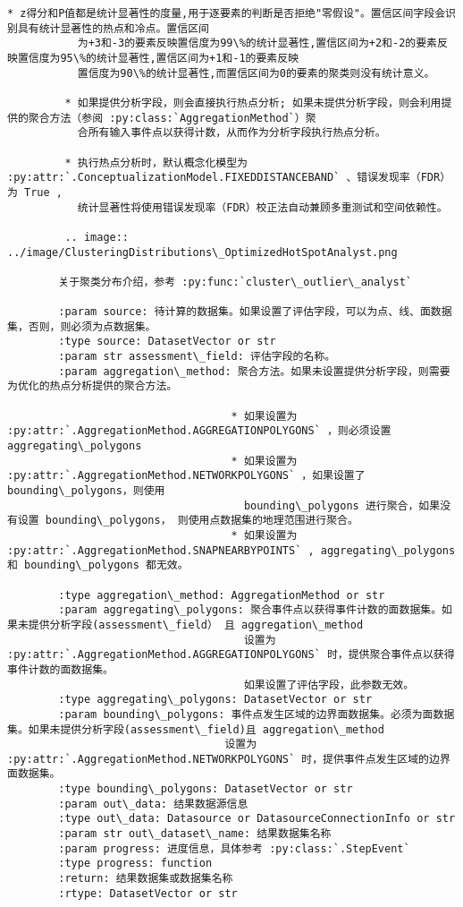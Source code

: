 \documentclass[11pt]{article}
\begin{document}
\begin{Verbatim}[commandchars=\\\{\}]
         * z得分和P值都是统计显著性的度量,用于逐要素的判断是否拒绝"零假设"。置信区间字段会识别具有统计显著性的热点和冷点。置信区间
           为+3和-3的要素反映置信度为99\%的统计显著性,置信区间为+2和-2的要素反映置信度为95\%的统计显著性,置信区间为+1和-1的要素反映
           置信度为90\%的统计显著性,而置信区间为0的要素的聚类则没有统计意义。
        
         * 如果提供分析字段，则会直接执行热点分析; 如果未提供分析字段，则会利用提供的聚合方法（参阅 :py:class:`AggregationMethod`）聚
           合所有输入事件点以获得计数，从而作为分析字段执行热点分析。
        
         * 执行热点分析时，默认概念化模型为 :py:attr:`.ConceptualizationModel.FIXEDDISTANCEBAND` 、错误发现率（FDR）为 True ,
           统计显著性将使用错误发现率（FDR）校正法自动兼顾多重测试和空间依赖性。
        
         .. image:: ../image/ClusteringDistributions\_OptimizedHotSpotAnalyst.png
        
        关于聚类分布介绍，参考 :py:func:`cluster\_outlier\_analyst`
        
        :param source: 待计算的数据集。如果设置了评估字段，可以为点、线、面数据集，否则，则必须为点数据集。
        :type source: DatasetVector or str
        :param str assessment\_field: 评估字段的名称。
        :param aggregation\_method: 聚合方法。如果未设置提供分析字段，则需要为优化的热点分析提供的聚合方法。
        
                                   * 如果设置为 :py:attr:`.AggregationMethod.AGGREGATIONPOLYGONS` ，则必须设置 aggregating\_polygons
                                   * 如果设置为 :py:attr:`.AggregationMethod.NETWORKPOLYGONS` ，如果设置了 bounding\_polygons，则使用
                                     bounding\_polygons 进行聚合，如果没有设置 bounding\_polygons， 则使用点数据集的地理范围进行聚合。
                                   * 如果设置为 :py:attr:`.AggregationMethod.SNAPNEARBYPOINTS` , aggregating\_polygons 和 bounding\_polygons 都无效。
        
        :type aggregation\_method: AggregationMethod or str
        :param aggregating\_polygons: 聚合事件点以获得事件计数的面数据集。如果未提供分析字段(assessment\_field） 且 aggregation\_method
                                     设置为 :py:attr:`.AggregationMethod.AGGREGATIONPOLYGONS` 时，提供聚合事件点以获得事件计数的面数据集。
                                     如果设置了评估字段，此参数无效。
        :type aggregating\_polygons: DatasetVector or str
        :param bounding\_polygons: 事件点发生区域的边界面数据集。必须为面数据集。如果未提供分析字段(assessment\_field)且 aggregation\_method
                                  设置为 :py:attr:`.AggregationMethod.NETWORKPOLYGONS` 时，提供事件点发生区域的边界面数据集。
        :type bounding\_polygons: DatasetVector or str
        :param out\_data: 结果数据源信息
        :type out\_data: Datasource or DatasourceConnectionInfo or str
        :param str out\_dataset\_name: 结果数据集名称
        :param progress: 进度信息，具体参考 :py:class:`.StepEvent`
        :type progress: function
        :return: 结果数据集或数据集名称
        :rtype: DatasetVector or str
    

\end{Verbatim}
\end{document}
